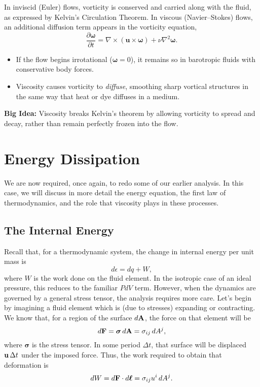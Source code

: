 \begin{bigidea}
In inviscid (Euler) flows, vorticity is conserved and carried along with the fluid, as expressed by 
Kelvin's Circulation Theorem. In viscous (Navier--Stokes) flows, an additional diffusion term 
appears in the vorticity equation, 
\[
\frac{\partial \boldsymbol{\omega}}{\partial t} 
= \nabla \times (\mathbf{u} \times \boldsymbol{\omega}) 
+ \nu \nabla^2 \boldsymbol{\omega}.
\]
\begin{itemize}
    \item If the flow begins irrotational ($\boldsymbol{\omega}=0$), it remains so in barotropic fluids 
    with conservative body forces.
    \item Viscosity causes vorticity to \emph{diffuse}, smoothing sharp vortical structures in the same 
    way that heat or dye diffuses in a medium.
\end{itemize}
\textbf{Big Idea:} Viscosity breaks Kelvin’s theorem by allowing vorticity to spread and decay, rather 
than remain perfectly frozen into the flow.
\end{bigidea}

\section{Energy Dissipation}

We are now required, once again, to redo some of our earlier analysis. In this case, we will discuss in more detail the energy equation, the first law of thermodynamics, and the role that viscosity plays in these processes.

\subsection{The Internal Energy}

Recall that, for a thermodynamic system, the change in internal energy per unit mass is
\[
d\epsilon = dq + W,
\]
where $W$ is the work done on the fluid element. In the isotropic case of an ideal
pressure, this reduces to the familiar $PdV$ term. However, when the dynamics are governed
by a general stress tensor, the analysis requires more care.
\vspace{0.25cm}
\noindent
Let's begin by imagining a fluid element which is (due to stresses) expanding or contracting. 
We know that, for a region of the surface $d{\bf A}$, the force on that element will be
\[
d{\bf F} = \boldsymbol{\sigma} \, d{\bf A} = \sigma_{ij} \, dA^j, 
\]
where $\boldsymbol{\sigma}$ is the stress tensor. In some period $\Delta t$, that surface
will be displaced ${\bf u}\,\Delta t$ under the imposed force. Thus, the work required to
obtain that deformation is
\[
dW = d{\bf F} \cdot d{\boldsymbol{\ell}} = \sigma_{ij} u^i \, dA^j.
\]


